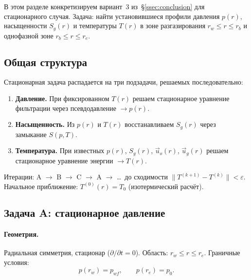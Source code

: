 ﻿\documentclass[12pt,a4paper]{article}
\begin{document}
В этом разделе конкретизируем вариант~3
из~\S\ref{ssec:conclusion} для стационарного случая.
Задача: найти установившиеся профили давления $p(r)$,
насыщенности $S_g(r)$ и температуры $T(r)$ в зоне
разгазирования $r_w \leqslant r \leqslant r_b$ и однофазной
зоне $r_b \leqslant r \leqslant r_e$.

\subsection{Общая структура}\label{ssec:structure}

Стационарная задача распадается на три подзадачи,
решаемых последовательно:

\begin{enumerate}[label=\textbf{\Alph*.}, nosep, leftmargin=*]
  \item \textbf{Давление.}
        При фиксированном $T(r)$ решаем стационарное уравнение
        фильтрации через псевдодавление $\to p(r)$.
  \item \textbf{Насыщенность.}
        Из $p(r)$ и $T(r)$ восстанавливаем $S_g(r)$
        через замыкание $S(p,T)$.
  \item \textbf{Температура.}
        При известных $p(r)$, $S_g(r)$, $\vec{u}_o(r)$,
        $\vec{u}_g(r)$ решаем стационарное уравнение
        энергии $\to T(r)$.
\end{enumerate}
Итерации: A $\to$ B $\to$ C $\to$ A $\to$ \ldots\
до сходимости $\|T^{(k+1)} - T^{(k)}\| < \varepsilon$.
Начальное приближение: $T^{(0)}(r) = T_0$ (изотермический
расчёт).

\subsection{Задача A: стационарное давление}\label{ssec:pressure}

\paragraph{Геометрия.}
Радиальная симметрия, стационар ($\partial/\partial t = 0$).
Область: $r_w \leqslant r \leqslant r_e$.
Граничные условия:
\begin{equation}\label{eq:bc_stat}
  p(r_w) = p_{wf}, \qquad p(r_e) = p_0.
\end{equation}
\end{document}
